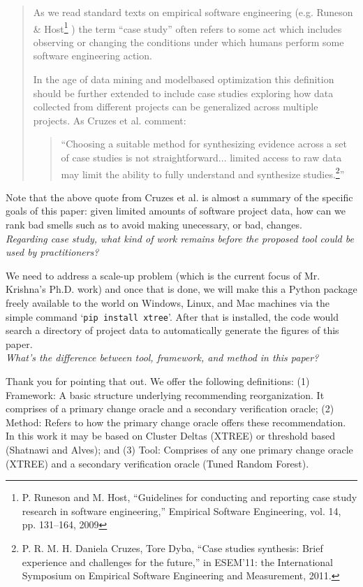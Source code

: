 \documentclass[twocolumn,5p]{elsarticle}
\newcommand{\review}[1]{\noindent\textit{#1\\}}
\theoremstyle{break}
\begin{document}
\begin{quote}
	
	As we read standard texts on empirical software engineering
	(e.g. Runeson \& Host\footnote{P. Runeson and M. Host, ``Guidelines for 
	conducting and reporting
		case study research in software engineering,'' Empirical Software
		Engineering, vol. 14, pp. 131–164, 2009} ) the term ``case study'' 
		often 
	refers to some act which includes observing or changing
	the conditions under which humans perform some software
	engineering action.
	
	In the age of data mining and modelbased
	optimization this definition should be further extended
	to include case studies exploring how data collected from
	different projects can be generalized across multiple projects.
	As Cruzes et al. comment:
	\begin{quote}
		``Choosing a suitable method for synthesizing evidence
		across a set of case studies is not straightforward...
		limited access to raw data may limit the ability
		to fully understand and synthesize studies.\footnote{P. R. M. H. 
		Daniela Cruzes, Tore Dyba, ``Case studies synthesis:
			Brief experience and challenges for the future,'' in ESEM’11: the
			International Symposium on Empirical Software Engineering and 
			Measurement,
			2011.}''
	\end{quote}
\end{quote}
Note that the above quote from Cruzes et al. is almost a summary of the
specific goals of this paper: given limited amounts of software
project data, how can we rank bad smells such as to avoid making unecessary, or 
bad, changes.
\\

\review{Regarding case study, what kind of work remains before the proposed 
tool could be used by practitioners?}

We need to address a scale-up problem (which is the current focus of Mr. 
Krishna's Ph.D. work) and once that is done,
we will make this a Python package freely available to the world on Windows,
Linux, and Mac machines via the simple command `\texttt{pip install xtree}'.
After that is installed, the code would search a directory of project data to 
automatically generate the figures of this paper.\\

\review{What’s the difference between tool, framework, and method in this 
	paper?}

Thank you for pointing that out. We offer the following definitions: (1) 
Framework: A basic structure underlying recommending reorganization. It 
comprises of a primary change oracle and a secondary verification oracle; 
(2) Method: Refers to how the primary change oracle offers these 
recommendation. 
In this work it may be based on Cluster Deltas (XTREE) or threshold based 
(Shatnawi and Alves); and (3) Tool: Comprises of any one primary change 
oracle (XTREE) and a secondary verification oracle (Tuned Random Forest). 
\end{document}
